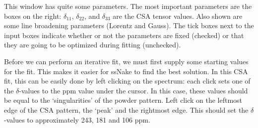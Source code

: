 \documentclass[11pt,a4paper]{article}
\begin{document}
This window has quite some parameters.
The most important parameters are the boxes on the right: $\delta_{11}$, $\delta_{22}$, and $\delta_{33}$ are the CSA tensor values.
Also shown are some line broadening parameters (Lorentz and Gauss).
The tick boxes next to the input boxes indicate whether or not the parameters are fixed (checked) or that they are going to be optimized during fitting (unchecked).

Before we can perform an iterative fit, we must first supply some starting values for the fit.
This makes it easier for ssNake to find the best solution.
In this CSA fit, this can be easily done by left clicking on the spectrum: each click sets one of the $\delta$-values to the ppm value under the cursor.
In this case, these values should be equal to the `singularities' of the powder pattern.
Left click on the leftmost edge of the CSA pattern, the `peak' and the rightmost edge.
This should set the $\delta$-values to approximately 243, 181 and 106 ppm.
\end{document}
